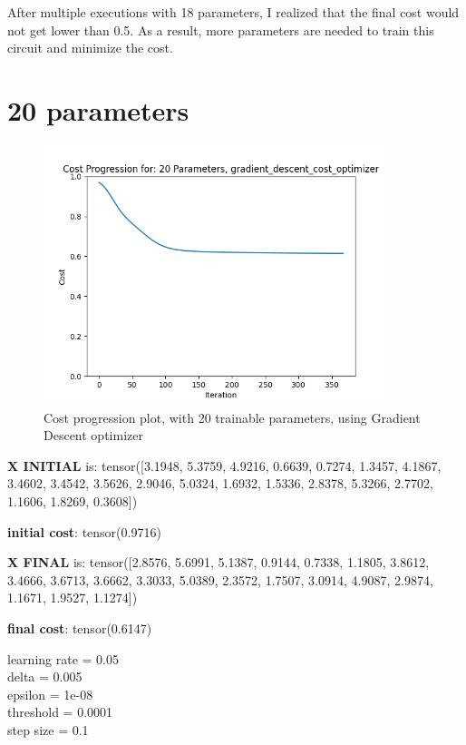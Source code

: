 \documentclass[inscr,ack,preface]{diphdthesis}
\begin{document}
After multiple executions with 18 parameters, I realized that the final cost would not get lower than 0.5. As a result, more parameters are needed to train this circuit and minimize the cost. 

\section{20 parameters}

\begin{figure}[H]
\begin{center}
    \includegraphics[width=0.9\textwidth]{20.png}
    \caption{Cost progression plot, with 20 trainable parameters, using Gradient Descent optimizer} 
    \label{fig:enter-label}
    \end{center}
\end{figure}

\textbf{X INITIAL} is: tensor([3.1948, 5.3759, 4.9216, 0.6639, 0.7274, 1.3457, 4.1867, 3.4602, 3.4542,
        3.5626, 2.9046, 5.0324, 1.6932, 1.5336, 2.8378, 5.3266, 2.7702, 1.1606,
        1.8269, 0.3608])

\textbf{initial cost}: tensor(0.9716)

\textbf{X FINAL} is: tensor([2.8576, 5.6991, 5.1387, 0.9144, 0.7338, 1.1805, 3.8612, 3.4666, 3.6713, 3.6662, 3.3033, 5.0389, 2.3572, 1.7507, 3.0914, 4.9087, 2.9874, 1.1671, 1.9527, 1.1274])

\textbf{final cost}: tensor(0.6147)

learning rate =  0.05 \\
delta =  0.005 \\
epsilon =  1e-08 \\
threshold =  0.0001\\
step size =  0.1 \\
\end{document}
